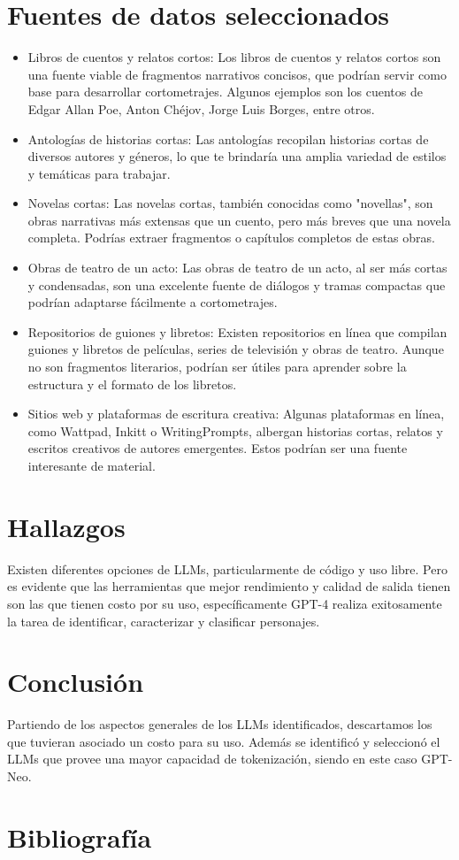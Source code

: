 \documentclass[journal,onecolumn]{IEEEtran}
\begin{document}
	\section{Fuentes de datos seleccionados}
	\begin{itemize}
		\item Libros de cuentos y relatos cortos: Los libros de cuentos y relatos cortos son una fuente viable de fragmentos narrativos concisos, que podrían servir como base para desarrollar cortometrajes. Algunos ejemplos son los cuentos de Edgar Allan Poe, Anton Chéjov, Jorge Luis Borges, entre otros.
		\item Antologías de historias cortas: Las antologías recopilan historias cortas de diversos autores y géneros, lo que te brindaría una amplia variedad de estilos y temáticas para trabajar.
		\item Novelas cortas: Las novelas cortas, también conocidas como "novellas", son obras narrativas más extensas que un cuento, pero más breves que una novela completa. Podrías extraer fragmentos o capítulos completos de estas obras.
		\item Obras de teatro de un acto: Las obras de teatro de un acto, al ser más cortas y condensadas, son una excelente fuente de diálogos y tramas compactas que podrían adaptarse fácilmente a cortometrajes.
		\item Repositorios de guiones y libretos: Existen repositorios en línea que compilan guiones y libretos de películas, series de televisión y obras de teatro. Aunque no son fragmentos literarios, podrían ser útiles para aprender sobre la estructura y el formato de los libretos.
		\item Sitios web y plataformas de escritura creativa: Algunas plataformas en línea, como Wattpad, Inkitt o WritingPrompts, albergan historias cortas, relatos y escritos creativos de autores emergentes. Estos podrían ser una fuente interesante de material.
	\end{itemize}
	\section{Hallazgos}
	Existen diferentes opciones de LLMs, particularmente de código y uso libre. Pero es evidente que las herramientas que mejor rendimiento y calidad de salida tienen son las que tienen costo por su uso, específicamente GPT-4 realiza exitosamente la tarea de identificar, caracterizar y clasificar personajes.
	\section{Conclusión}
	Partiendo de los aspectos generales de los LLMs identificados,  descartamos los que tuvieran asociado un costo para su uso. Además se identificó y seleccionó el LLMs que provee una mayor capacidad de tokenización, siendo en este caso GPT-Neo.
	
	\section{Bibliografía}
		\renewcommand\refname{Referencias}
	
	
	
\end{document}
